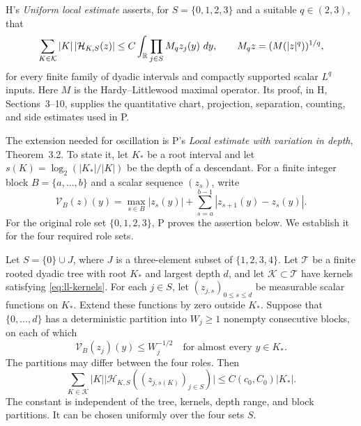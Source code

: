 H's \emph{Uniform local estimate}
\cite[Theorem~2.2]{HilbertCompanion}
asserts, for $S=\{0,1,2,3\}$ and a suitable $q\in(2,3)$, that
\begin{equation}
 \sum_{K\in\mathcal K}|K|\,|\mathcal H_{K,S}(z)|
 \le C\int_{\mathbb R}\prod_{j\in S}M_qz_j(y)\,\,d y,
 \qquad M_qz=(M(|z|^q))^{1/q},
 \label{eq:ll-fixed-local}
\end{equation}
for every finite family of dyadic intervals and compactly supported
scalar $L^q$ inputs.  Here $M$ is the Hardy--Littlewood maximal
operator.  Its proof, in H, Sections~3--10, supplies the quantitative
chart, projection, separation, counting, and side estimates used in P.

The extension needed for oscillation is P's \emph{Local estimate with
variation in depth}, Theorem~3.2.  To state it, let $K_*$ be a root
interval and let $s(K)=\log_2(|K_*|/|K|)$ be the depth of a descendant.
For a finite integer block $B=\{a,\ldots,b\}$ and a scalar sequence
$(z_s)$, write
\[
 \mathcal V_B(z)(y)
 =\max_{s\in B}|z_s(y)|+
   \sum_{s=a}^{b-1}|z_{s+1}(y)-z_s(y)|.
\]
For the original role set $\{0,1,2,3\}$, P proves the assertion below.
We establish it for the four required role sets.

\begin{proposition}
\label{prop:ll-depth}
Let $S=\{0\}\cup J$, where $J$ is a three-element subset of
$\{1,2,3,4\}$.  Let $\mathcal T$ be a finite rooted dyadic tree with
root $K_*$ and largest depth $d$, and let $\mathcal K\subset\mathcal T$
have kernels satisfying \eqref{eq:ll-kernels}.  For each $j\in S$, let
$(z_{j,s})_{0\le s\le d}$ be measurable scalar functions on $K_*$.
Extend these functions by zero outside $K_*$.
Suppose that $\{0,\ldots,d\}$ has a deterministic partition into
$W_j\ge1$ nonempty consecutive blocks, on each of which
\[
 \mathcal V_B(z_j)(y)\le W_j^{-1/2}
 \quad\text{for almost every }y\in K_*.
\]
The partitions may differ between the four roles.  Then
\begin{equation}
 \sum_{K\in\mathcal K}|K|
   \bigl|\mathcal H_{K,S}((z_{j,s(K)})_{j\in S})\bigr|
 \le C(c_0,C_0)|K_*|.
 \label{eq:ll-depth}
\end{equation}
The constant is independent of the tree, kernels, depth range, and
block partitions.  It can be chosen uniformly over the four sets $S$.
\end{proposition}

